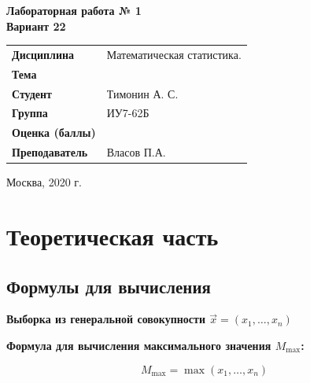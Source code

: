 \documentclass[12pt, a4paper]{report}
\begin{document}
\begin{titlepage}
		\vspace{2cm}
		
		\begin{center}
			\textbf{Лабораторная работа № 1} \\
			\vspace{0.5cm}
			\textbf{Вариант 22}
		\end{center}
		
		\vspace{4cm}
		
		\begin{flushleft}
			\begin{tabular}{ll}
				\textbf{Дисциплина} & Математическая статистика. \\
				\textbf{Тема} & \\
				\textbf{Студент} & Тимонин А. С. \\
				\textbf{Группа} & ИУ7-62Б \\
				\textbf{Оценка (баллы)} & \\
				\textbf{Преподаватель} & Власов П.А. \\
			\end{tabular}
		\end{flushleft}
		
		\vspace{6cm}
		
		\begin{center}
			Москва, 2020 г.
		\end{center}
		
		
	\end{titlepage}
	
	
	\section{Теоретическая часть}
	\subsection{Формулы для вычисления}
	
	\hspace{0.7cm}\textbf{Выборка из генеральной совокупности $\vec{x} = {(x_1, \dots, x_n)}$}
	
	\vspace{0.5cm}\textbf{Формула для вычисления максимального значения $M_{\max}$:}
	
	\begin{equation*} \label{Mmax}
	M_{\max} = \max{(x_1, \dots, x_n)}
	\end{equation*}
	
\end{document}
